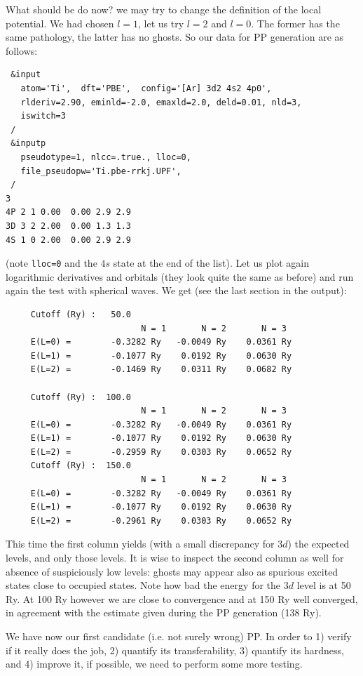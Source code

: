 \documentclass[12pt,a4paper]{article}
\begin{document}
What should be do now? we may try to change the definition of the
local potential. We had chosen $l=1$, let us try $l=2$ and $l=0$.
The former has the same pathology, the latter has no ghosts.
So our data for PP generation are as follows:
\begin{verbatim}
 &input
   atom='Ti',  dft='PBE',  config='[Ar] 3d2 4s2 4p0',
   rlderiv=2.90, eminld=-2.0, emaxld=2.0, deld=0.01, nld=3,
   iswitch=3
 /
 &inputp
   pseudotype=1, nlcc=.true., lloc=0,
   file_pseudopw='Ti.pbe-rrkj.UPF',
 /
3
4P 2 1 0.00  0.00 2.9 2.9
3D 3 2 2.00  0.00 1.3 1.3
4S 1 0 2.00  0.00 2.9 2.9
\end{verbatim}
(note \texttt{lloc=0} and the $4s$ state at the end of the list). 
Let us plot again logarithmic derivatives and orbitals (they look 
quite the same as before) and run again the test with spherical 
waves. We get (see the last section in the output):
\begin{verbatim}
     Cutoff (Ry) :   50.0
                           N = 1       N = 2       N = 3
     E(L=0) =        -0.3282 Ry   -0.0049 Ry    0.0361 Ry
     E(L=1) =        -0.1077 Ry    0.0192 Ry    0.0630 Ry
     E(L=2) =        -0.1469 Ry    0.0311 Ry    0.0682 Ry

     Cutoff (Ry) :  100.0
                           N = 1       N = 2       N = 3
     E(L=0) =        -0.3282 Ry   -0.0049 Ry    0.0361 Ry
     E(L=1) =        -0.1077 Ry    0.0192 Ry    0.0630 Ry
     E(L=2) =        -0.2959 Ry    0.0303 Ry    0.0652 Ry
     Cutoff (Ry) :  150.0
                           N = 1       N = 2       N = 3
     E(L=0) =        -0.3282 Ry   -0.0049 Ry    0.0361 Ry
     E(L=1) =        -0.1077 Ry    0.0192 Ry    0.0630 Ry
     E(L=2) =        -0.2961 Ry    0.0303 Ry    0.0652 Ry
\end{verbatim}
This time the first column yields (with a small discrepancy for $3d$)
the expected levels, and only those levels. It is wise to inspect
the second column as well for absence of suspiciously low levels: 
ghosts may appear also as spurious excited states close to occupied
states. Note how bad the energy for the $3d$ level is at 50 Ry.
At 100 Ry however we are close to convergence and at 150 Ry 
well converged, in agreement with the estimate given during 
the PP generation (138 Ry).

We have now our first candidate (i.e. not surely wrong) PP. 
In order to 1) verify if it really does the job, 2) quantify
its transferability, 3) quantify its hardness, and 4) improve 
it, if possible, we need to perform some more testing.
\end{document}

